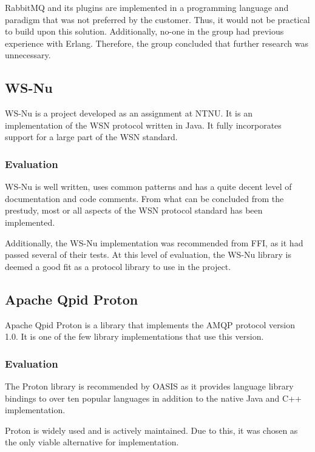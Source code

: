 RabbitMQ and its plugins are implemented in a programming language and paradigm that was not preferred by the customer. Thus, it would not be practical to build upon this solution. Additionally, no-one in the group had previous experience with Erlang. Therefore, the group concluded that further research was unnecessary.

\subsection{WS-Nu}
\label{subsec:prestudies-existing_solutions-ws_nu}

WS-Nu \cite{ws-nu} is a project developed as an assignment at NTNU. It is an implementation of the WSN protocol written in Java. It fully incorporates support for a large part of the WSN standard.

\subsubsection{Evaluation}
\label{subsec:prestudies-existing_solution-ws_nu-evaluation}

WS-Nu is well written, uses common patterns and has a quite decent level of documentation and code comments. From what can be concluded from the prestudy, most or all aspects of the WSN protocol standard has been implemented.

Additionally, the WS-Nu implementation was recommended from FFI, as it had passed several of their tests. At this level of evaluation, the WS-Nu library is deemed a good fit as a protocol library to use in the project.

\subsection{Apache Qpid Proton}
\label{subsub-apache_qpid_proton}
Apache Qpid Proton \cite{amqp-qpid-proton} is a library that implements the AMQP protocol version 1.0. It is one of the few library implementations that use this version.

\subsubsection{Evaluation}
The Proton library is recommended by OASIS as it provides language library bindings to over ten popular languages in addition to the native Java and C++ implementation.

Proton is widely used and is actively maintained. Due to this, it was chosen as the only viable alternative for implementation.

